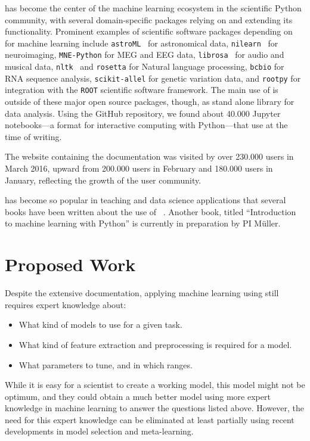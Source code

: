 \sklearn{} has become the center of the machine learning ecosystem in the scientific Python community,
with several domain-specific packages relying on and extending its functionality.
Prominent examples of scientific software packages depending on \sklearn{}
for machine learning include \texttt{astroML}~\autocite{van2013openml} for astronomical
data, \texttt{nilearn}~\autocite{abraham2014machine} for neuroimaging, \texttt{MNE-Python} for MEG
and EEG data, \texttt{librosa}~\autocite{mcfee2015librosa} for audio and musical data,
\texttt{nltk}~\autocite{bird2006nltk} and \texttt{rosetta} for Natural language processing, \texttt{bcbio} for
RNA sequence analysis, \texttt{scikit-allel} for genetic variation data, and \texttt{rootpy} for
integration with the \texttt{ROOT} scientific software framework.
The main use of \sklearn{} is outside of these major open source packages, though,
as stand alone library for data analysis. Using the GitHub repository, we found
about 40.000 Jupyter notebooks---a format for interactive computing with
Python---that use \sklearn{} at the time of writing.

The \sklearn{} website containing the documentation was visited by over
230.000 users in March 2016, upward from 200.000 users in February and 180.000 users in January,
reflecting the growth of the \sklearn{} user community.

\sklearn{} has become so popular in teaching and data science applications that
several books have been written about the use of
\sklearn{}~\autocite{garreta2013learning, hackeling2014mastering,
hauck2014scikit, raschka2015python}. Another book, titled ``Introduction to
machine learning with Python'' is currently in preparation by PI M\"uller.

\section{Proposed Work}
Despite the extensive documentation, applying machine learning using \sklearn{}
still requires expert knowledge about:
\begin{itemize}
    \item What kind of models to use for a given task.
    \item What kind of feature extraction and preprocessing is required for a model.
    \item What parameters to tune, and in which ranges.
\end{itemize}

While it is easy for a scientist to create a working model, this model might not
be optimum, and they could obtain a much better model using more expert knowledge
in machine learning to answer the questions listed above.
However, the need for this expert knowledge can be eliminated at least partially
using recent developments in model selection and meta-learning.

